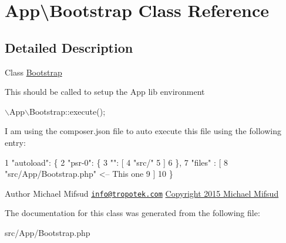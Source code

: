 \hypertarget{classApp_1_1Bootstrap}{\section{App\textbackslash{}Bootstrap Class Reference}
\label{classApp_1_1Bootstrap}
}


\subsection{Detailed Description}
Class \hyperlink{classApp_1_1Bootstrap}{Bootstrap}

This should be called to setup the App lib environment


\begin{DoxyCode}
\(\backslash\)App\(\backslash\)Bootstrap::execute();
\end{DoxyCode}


I am using the composer.\+json file to auto execute this file using the following entry\+:


\begin{DoxyCode}
1 "autoload":  \{
2   "psr-0":  \{
3     "":  [
4       "src/"
5     ]
6   \},
7   "files" : [
8     "src/App/Bootstrap.php"    <-- This one
9   ]
10 \}
\end{DoxyCode}


\begin{DoxyAuthor}{Author}
Michael Mifsud \href{mailto:info@tropotek.com}{\tt info@tropotek.\+com} \hyperlink{}{Copyright 2015 Michael Mifsud }
\end{DoxyAuthor}


The documentation for this class was generated from the following file\+:\begin{DoxyCompactItemize}
\item 
src/\+App/Bootstrap.\+php\end{DoxyCompactItemize}

